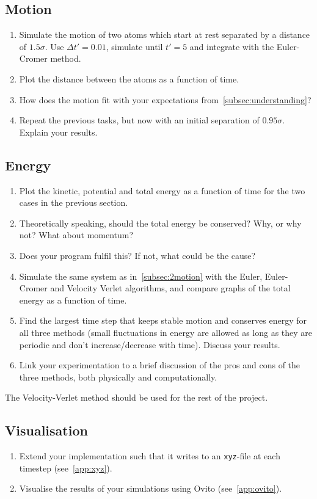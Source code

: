 \documentclass[11pt,british,a4paper]{report}
\begin{document}
\subsection{Motion}\label{subsec:2motion}
\begin{enumerate}[label=\roman*.]
    \item Simulate the motion of two atoms which start at rest separated by a distance of \(\num{1.5}\sigma\). Use \(\Delta t'=\num{0.01}\), simulate until \(t'=5\) and integrate with the Euler-Cromer method.
    \item Plot the distance between the atoms as a function of time.
    \item How does the motion fit with your expectations from~\vref{subsec:understanding}?
    \item Repeat the previous tasks, but now with an initial separation of \(\num{0.95}\sigma\). Explain your results.
\end{enumerate}

\subsection{Energy}
\begin{enumerate}[label=\roman*.]
    \item Plot the kinetic, potential and total energy as a function of time for the two cases in the previous section.
    \item Theoretically speaking, should the total energy be conserved? Why, or why not? What about momentum?
    \item Does your program fulfil this? If not, what could be the cause?
    \item Simulate the same system as in~\vref{subsec:2motion} with the Euler, Euler-Cromer and Velocity Verlet algorithms, and compare graphs of the total energy as a function of time.
    \item Find the largest time step that keeps stable motion and conserves energy for all three methods (small fluctuations in energy are allowed as long as they are periodic and don't increase/decrease with time). Discuss your results.
    \item Link your experimentation to a brief discussion of the pros and cons of the three methods, both physically and computationally.
\end{enumerate}

The Velocity-Verlet method should be used for the rest of the project.

\subsection{Visualisation}
\begin{enumerate}[label=\roman*.]
    \item Extend your implementation such that it writes to an \texttt{xyz}-file at each timestep (see~\vref{app:xyz}).
    \item Visualise the results of your simulations using Ovito (see~\vref{app:ovito}).
\end{enumerate}
\end{document}
